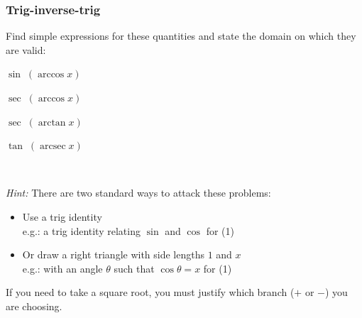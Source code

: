 \documentclass[14pt]{beamer}
\newcommand {\DS} [1] {${\displaystyle #1}$}
\newcommand{\p}{\pause}
\newcommand{\setsize}[1]{\fontsize{#1}{#1}\selectfont} %
\newcommand{\smallerfont}{\setsize{13}} %
\newcommand{\arcsec}{\operatorname{arcsec}}
\begin{document}
\begin{frame}[t]
\frametitle{Trig-inverse-trig}

\begin{block}{}
Find simple expressions for these quantities and state the domain on which they are valid:
	\begin{enumerate}
	\begin{multicols}{2}
		\item  \DS{\sin \; ( \arccos x)}
		\item \DS{\sec \; (\arccos x)}
		\item \DS{\sec \; ( \arctan x)}
		\item \DS{\tan \; (\arcsec x)}
	\end{multicols}
	\end{enumerate}
\vspace{-.1cm}	
\end{block}

\ \p

{\smallerfont
\emph{Hint:}  There are two standard ways to attack these problems:
	\begin{itemize}
		\item  Use a trig identity  \\  e.g.: a trig identity relating $\sin$ and $\cos$ for (1)
		\item  Or draw a right triangle with side lengths $1$ and $x$ 
			\\ e.g.: with an angle $\theta$ such that $\cos \theta = x$ for (1)
	\end{itemize}
If you need to take a square root, you must justify which branch ($+$ or $-$) you are choosing.
}

\end{frame}





















\end{document}
